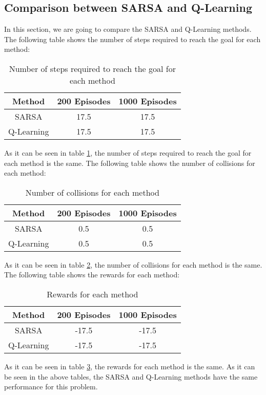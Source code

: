 \documentclass{article}
\begin{document}
	\subsection{Comparison between SARSA and Q-Learning}
	In this section, we are going to compare the SARSA and Q-Learning methods. The following table shows the number of steps required to reach the goal for each method:
	\begin{table}[H]
		\centering
		\caption{Number of steps required to reach the goal for each method}
		\label{tab:steps}
		\begin{tabular}{|c|c|c|}
			\hline
			\textbf{Method} & \textbf{200 Episodes} & \textbf{1000 Episodes} \\ \hline
			SARSA           & 17.5                  & 17.5                   \\ \hline
			Q-Learning      & 17.5                  & 17.5                   \\ \hline
		\end{tabular}
	\end{table}
	As it can be seen in table \ref{tab:steps}, the number of steps required to reach the goal for each method is the same. The following table shows the number of collisions for each method:
	\begin{table}[H]
		\centering
		\caption{Number of collisions for each method}
		\label{tab:collisions}
		\begin{tabular}{|c|c|c|}
			\hline
			\textbf{Method} & \textbf{200 Episodes} & \textbf{1000 Episodes} \\ \hline
			SARSA           & 0.5                   & 0.5                    \\ \hline
			Q-Learning      & 0.5                   & 0.5                    \\ \hline
		\end{tabular}
	\end{table}
	As it can be seen in table \ref{tab:collisions}, the number of collisions for each method is the same. The following table shows the rewards for each method:
	\begin{table}[H]
		\centering
		\caption{Rewards for each method}
		\label{tab:rewards}
		\begin{tabular}{|c|c|c|}
			\hline
			\textbf{Method} & \textbf{200 Episodes} & \textbf{1000 Episodes} \\ \hline
			SARSA           & -17.5                  & -17.5                   \\ \hline
			Q-Learning      & -17.5                  & -17.5                   \\ \hline
		\end{tabular}
	\end{table}
	As it can be seen in table \ref{tab:rewards}, the rewards for each method is the same. As it can be seen in the above tables, the SARSA and Q-Learning methods have the same performance for this problem.

	\tableofcontents
	\listoffigures
	\listoftables
\end{document}
